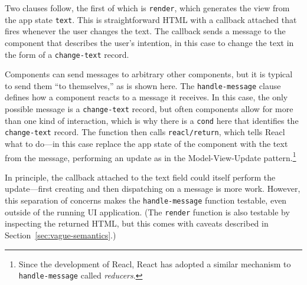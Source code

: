\documentclass[sigplan,review,screen]{acmart}
\begin{document}
Two clauses follow, the first of which is \texttt{render}, which
generates the view from the app state \texttt{text}.  This is
straightforward HTML with a callback attached that fires whenever the
user changes the text.  The callback sends a
message to the component that describes the user's intention,
in this case to change the text in the form of a \texttt{change-text}
record.

Components can send messages to arbitrary other components, but it is
typical to send them ``to themselves,'' as is shown here.  The
\texttt{handle-message} clause defines how a component reacts to a
message it receives.  In this case, the only possible message is a
\texttt{change-text} record, but often components allow for more than
one kind of interaction, which is why there is a \texttt{cond} here that
identifies the \texttt{change-text} record.  The function then calls
\texttt{reacl/return}, which tells Reacl what
to do---in this case replace the app state of the component with the
text from the message, performing an update as in the
Model-View-Update pattern.\footnote{Since the development of Reacl,
  React has adopted a similar mechanism to \texttt{handle-message}
  called \textit{reducers}.}

In principle, the callback attached to the text field could itself
perform the update---first creating and then dispatching on a message
is more work.  However, this separation of concerns makes the
\texttt{handle-message} function testable, even outside of the running
UI application.  (The \texttt{render} function is also testable by
inspecting the returned HTML, but this comes with caveats described in
Section~\ref{sec:vague-semantics}.)
\end{document}
